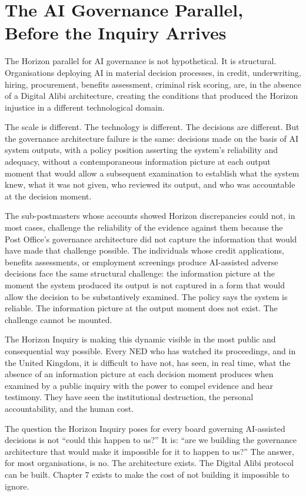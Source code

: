 \scenebreak

\section{The AI Governance Parallel, Before the Inquiry Arrives}

The Horizon parallel for AI governance is not hypothetical. It is structural. Organisations deploying AI in material decision processes, in credit, underwriting, hiring, procurement, benefits assessment, criminal risk scoring, are, in the absence of a Digital Alibi architecture, creating the conditions that produced the Horizon injustice in a different technological domain.

The scale is different. The technology is different. The decisions are different. But the governance architecture failure is the same: decisions made on the basis of AI system outputs, with a policy position asserting the system's reliability and adequacy, without a contemporaneous information picture at each output moment that would allow a subsequent examination to establish what the system knew, what it was not given, who reviewed its output, and who was accountable at the decision moment.

The sub-postmasters whose accounts showed Horizon discrepancies could not, in most cases, challenge the reliability of the evidence against them because the Post Office's governance architecture did not capture the information that would have made that challenge possible. The individuals whose credit applications, benefits assessments, or employment screenings produce AI-assisted adverse decisions face the same structural challenge: the information picture at the moment the system produced its output is not captured in a form that would allow the decision to be substantively examined. The policy says the system is reliable. The information picture at the output moment does not exist. The challenge cannot be mounted.

The Horizon Inquiry is making this dynamic visible in the most public and consequential way possible. Every NED who has watched its proceedings, and in the United Kingdom, it is difficult to have not, has seen, in real time, what the absence of an information picture at each decision moment produces when examined by a public inquiry with the power to compel evidence and hear testimony. They have seen the institutional destruction, the personal accountability, and the human cost.

The question the Horizon Inquiry poses for every board governing AI-assisted decisions is not ``could this happen to us?'' It is: ``are we building the governance architecture that would make it impossible for it to happen to us?'' The answer, for most organisations, is no. The architecture exists. The Digital Alibi protocol can be built. Chapter 7 exists to make the cost of not building it impossible to ignore.

